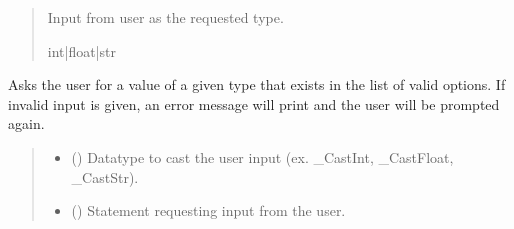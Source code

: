 \documentclass[letterpaper,10pt,english]{sphinxmanual}
\begin{document}
\begin{fulllineitems}
\begin{fulllineitems}
\begin{quote}
\begin{description}
\begin{itemize}
\end{itemize}

\sphinxAtStartPar
Input from user as the requested type.

\sphinxAtStartPar
int|float|str

\end{description}\end{quote}

\end{fulllineitems}


\begin{fulllineitems}
\label{\detokenize{Setup.Inputs:Setup.Inputs.GetUserInput.UserInput.AskForTypeInList}}
\pysigstartsignatures
{}
\pysigstopsignatures
\sphinxAtStartPar
Asks the user for a value of a given type that exists in the list of valid options.  If invalid         input is given, an error message will print and the user will be prompted again.
\begin{quote}\begin{description}
\begin{itemize}
\item {} 
\sphinxAtStartPar
{} () \textendash{} Datatype to cast the user input (ex. \_CastInt, \_CastFloat, \_CastStr).

\item {} 
\sphinxAtStartPar
{} () \textendash{} Statement requesting input from the user.


\end{itemize}
\end{description}
\end{quote}
\end{fulllineitems}
\end{fulllineitems}
\end{document}
